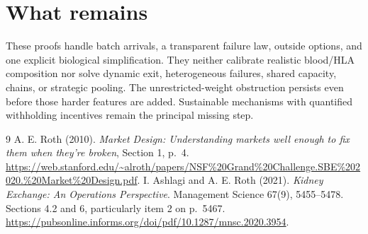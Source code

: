 \documentclass[11pt]{article}
\theoremstyle{remark}
\begin{document}
\section{What remains}
These proofs handle batch arrivals, a transparent failure law, outside
options, and one explicit biological simplification. They neither
calibrate realistic blood/HLA composition nor solve dynamic exit,
heterogeneous failures, shared capacity, chains, or strategic pooling.
The unrestricted-weight obstruction persists even before those harder
features are added. Sustainable mechanisms with quantified withholding
incentives remain the principal missing step.
\begin{thebibliography}{9}
 A. E. Roth (2010). \emph{Market Design: Understanding
markets well enough to fix them when they're broken}, Section 1, p.~4.
\url{https://web.stanford.edu/~alroth/papers/NSF%20Grand%20Challenge.SBE%202020.%20Market%20Design.pdf}.
 I. Ashlagi and A. E. Roth (2021). \emph{Kidney Exchange:
An Operations Perspective}. Management Science 67(9), 5455--5478.
Sections 4.2 and 6, particularly item 2 on p.~5467.
\url{https://pubsonline.informs.org/doi/pdf/10.1287/mnsc.2020.3954}.
\end{thebibliography}
\end{document}
